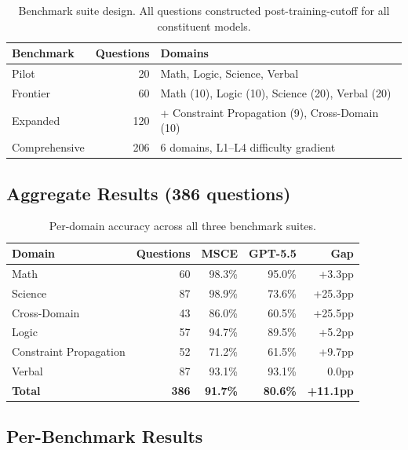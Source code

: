 \documentclass[11pt,a4paper]{article}
\begin{document}
\begin{table}[ht]
\centering
\begin{tabular}{lrl}
\toprule
\textbf{Benchmark} & \textbf{Questions} & \textbf{Domains} \\
\midrule
Pilot & 20 & Math, Logic, Science, Verbal \\
Frontier & 60 & Math (10), Logic (10), Science (20), Verbal (20) \\
Expanded & 120 & + Constraint Propagation (9), Cross-Domain (10) \\
Comprehensive & 206 & 6 domains, L1–L4 difficulty gradient \\
\bottomrule
\end{tabular}
\caption{Benchmark suite design. All questions constructed post-training-cutoff for all constituent models.}
\end{table}

\subsection{Aggregate Results (386 questions)}

\begin{table}[ht]
\centering
\begin{tabular}{lrrrr}
\toprule
\textbf{Domain} & \textbf{Questions} & \textbf{MSCE} & \textbf{GPT-5.5} & \textbf{Gap} \\
\midrule
Math & 60 & 98.3\% & 95.0\% & +3.3pp \\
Science & 87 & 98.9\% & 73.6\% & +25.3pp \\
Cross-Domain & 43 & 86.0\% & 60.5\% & +25.5pp \\
Logic & 57 & 94.7\% & 89.5\% & +5.2pp \\
Constraint Propagation & 52 & 71.2\% & 61.5\% & +9.7pp \\
Verbal & 87 & 93.1\% & 93.1\% & 0.0pp \\
\midrule
\textbf{Total} & \textbf{386} & \textbf{91.7\%} & \textbf{80.6\%} & \textbf{+11.1pp} \\
\bottomrule
\end{tabular}
\caption{Per-domain accuracy across all three benchmark suites.}
\end{table}

\subsection{Per-Benchmark Results}
\end{document}
